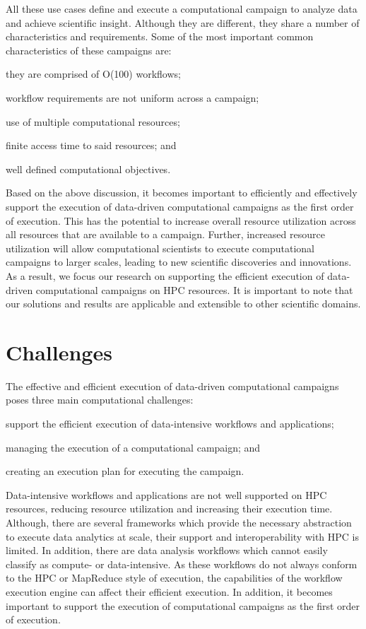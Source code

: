 All these use cases define and execute a computational campaign to analyze data and achieve scientific insight.
Although they are different, they share a number of characteristics and requirements.
Some of the most important common characteristics of these campaigns are:
\begin{inparaenum}[(1)]
    \item they are comprised of O(100) workflows;
    \item workflow requirements are not uniform across a campaign;
    \item use of multiple computational resources;
    \item finite access time to said resources; and
    \item well defined computational objectives.
\end{inparaenum}

Based on the above discussion, it becomes important to efficiently and effectively support the execution of data-driven computational campaigns as the first order of execution.
This has the potential to increase overall resource utilization across all resources that are available to a campaign.
Further, increased resource utilization will allow computational scientists to execute computational campaigns to larger scales, leading to new scientific discoveries and innovations.
As a result, we focus our research on supporting the efficient execution of data-driven computational campaigns on HPC resources.
It is important to note that our solutions and results are applicable and extensible to other scientific domains.

\section{Challenges}

The effective and efficient execution of data-driven computational campaigns poses three main computational challenges:
\begin{inparaenum}[1)]
    \item support the efficient execution of data-intensive workflows and applications;
    \item managing the execution of a computational campaign; and
    \item creating an execution plan for executing the campaign.
\end{inparaenum}

Data-intensive workflows and applications are not well supported on HPC resources, reducing resource utilization and increasing their execution time.
Although, there are several frameworks which provide the necessary abstraction to execute data analytics at scale, their support and interoperability with HPC is limited.
In addition, there are data analysis workflows which cannot easily classify as compute- or data-intensive.
As these workflows do not always conform to the HPC or MapReduce style of execution, the capabilities of the workflow execution engine can affect their efficient execution.
In addition, it becomes important to support the execution of computational campaigns as the first order of execution.

